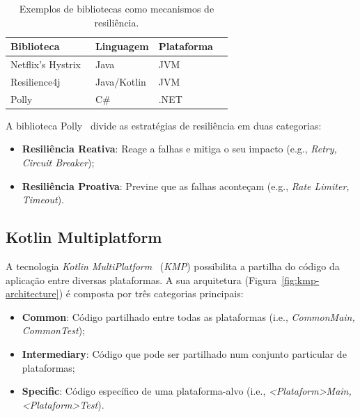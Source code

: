 \begin{table}[h]
    \centering
    \caption{Exemplos de bibliotecas como mecanismos de resiliência.}
    \label{tab:resilience_libraries}
    \begin{tabular}{|l|l|l|l|}
        \hline
        \textbf{Biblioteca}                      & \textbf{Linguagem} & \textbf{Plataforma} \\ \hline
        Netflix's Hystrix~\cite{netflix-hystrix} & Java               & JVM                 \\ \hline
        Resilience4j~\cite{resilience4j}         & Java/Kotlin        & JVM                 \\ \hline
        Polly ~\cite{polly-dotnet}               & C\#                & .NET                \\
        \hline
    \end{tabular}
\end{table}

A biblioteca Polly~\cite{polly-dotnet} divide as estratégias de resiliência em duas categorias:

\begin{itemize}[topsep=0pt,itemsep=0pt,partopsep=0pt, parsep=0pt]
    \item \textbf{Resiliência Reativa}: Reage a falhas e mitiga o seu impacto (e.g., \textit{Retry, Circuit Breaker});
    \item \textbf{Resiliência Proativa}: Previne que as falhas aconteçam (e.g., \textit{Rate Limiter, Timeout}).
\end{itemize}

\subsection{Kotlin Multiplatform}\label{subsec:kotlin-multiplatform}

A tecnologia \textit{Kotlin MultiPlatform}~\cite{kmp} (\textit{KMP}) possibilita a partilha do código da aplicação entre diversas plataformas.
A sua arquitetura (Figura~\ref{fig:kmp-architecture}) é composta por três categorias principais:

\begin{itemize}[topsep=0pt,itemsep=0pt,partopsep=0pt, parsep=0pt]
    \item \textbf{Common}: Código partilhado entre todas as plataformas (i.e., \textit{CommonMain, CommonTest});
    \item \textbf{Intermediary}: Código que pode ser partilhado num conjunto particular de plataformas;
    \item \textbf{Specific}: Código específico de uma plataforma-alvo (i.e., \textit{\textless Plataform\textgreater Main, \textless Plataform\textgreater Test}).
\end{itemize}

